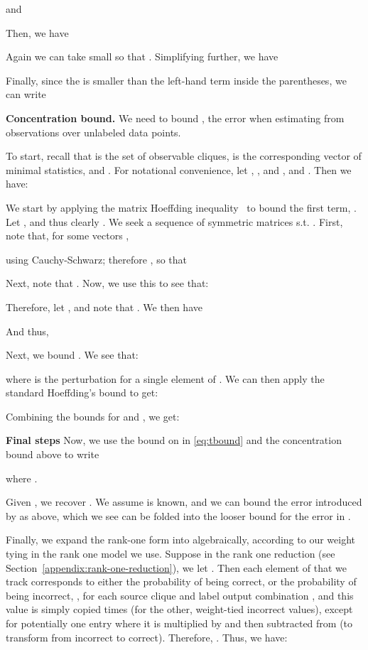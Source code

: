 \documentclass[letterpaper]{article}
\begin{document}
\begin{appendix}
and

Then, we have
 

Again we can take  small so that . Simplifying further, we have

Finally, since the  is smaller than the left-hand term inside the parentheses, we can write

 
{\bf Concentration bound.}
We need to bound , the error when estimating  from observations   over  unlabeled data points.

To start, recall that  is the set of observable cliques,  is the corresponding vector of minimal statistics, and .
For notational convenience, let , , and , and .
Then we have:

We start by applying the matrix Hoeffding inequality~\citep{tropp2015introduction} to bound the first term, .
Let , and thus clearly .
We seek a sequence of symmetric matrices  s.t. .
First, note that, for some vectors ,

using Cauchy-Schwarz; therefore , so that

Next, note that .
Now, we use this to see that:

Therefore, let , and note that .
We then have

And thus,


Next, we bound .
We see that:

where  is the perturbation for a single element of .
We can then apply the standard Hoeffding's bound to get:

Combining the bounds for  and , we get:

 
{\bf Final steps} 
Now, we use the bound on  in \eqref{eq:tbound} and the concentration bound above to write
 
 where .

Given , we recover .
We assume  is known, and we can bound the error introduced by  as above, which we see can be folded into the looser bound for the error in .

Finally, we expand the rank-one form  into  algebraically, according to our weight tying in the rank one model we use.
Suppose in the rank one reduction (see Section~\ref{appendix:rank-one-reduction}), we let .
Then each element of  that we track corresponds to either the probability of being correct,  or the probability of being incorrect, , for each source clique  and label output combination , and this value is simply copied  times (for the other, weight-tied incorrect values), except for potentially one entry where it is multiplied by  and then subtracted from  (to transform from incorrect to correct).
Therefore, .
Thus, we have:


\end{appendix}
\end{document}
